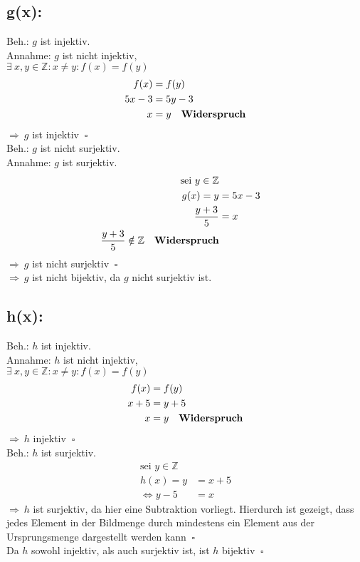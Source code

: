 \documentclass[a4paper]{scrartcl}
\newcommand{\qed}{\ \square}
\begin{document}
\subsection{g(x):}
	Beh.: \(g\) ist injektiv.\\
	Annahme: \(g\) ist nicht injektiv,\\
	\(\exists\ x,y \in \mathbb{Z}:x\neq y:f(x)=f(y)\) 
	\begin{align}
		f(x) &= f(y)\\
		5x-3 &= 5y-3\\
		x&=y \quad \text{\textbf{Widerspruch}}
	\end{align}
	\(\Rightarrow \ g\) ist injektiv \(\qed\)\\

	Beh.: \(g\) ist nicht surjektiv.\\
	Annahme: \(g\) ist surjektiv.\\
	\begin{align}
		\text{sei } y\in\mathbb{Z}\\
		g(x)=y&=5x-3\\
		\frac{y+3}{5}&=x\\
		\frac{y+3}{5}\notin\mathbb{Z}\quad \text{\textbf{Widerspruch}}
	\end{align}
	\(\Rightarrow \ g\) ist nicht surjektiv \(\qed\)\\
	\(\Rightarrow \ g\) ist nicht bijektiv, da \(g\) nicht surjektiv ist.\\

\subsection{h(x):}
	Beh.: \(h\) ist injektiv.\\
	Annahme: \(h\) ist nicht injektiv,\\
	\(\exists\ x,y \in \mathbb{Z}:x\neq y:f(x)=f(y)\)
	\begin{align}
		f(x) &= f(y)\\
		x+5&=y+5\\
		x&=y \quad \text{\textbf{Widerspruch}}
	\end{align}
	\(\Rightarrow \ h\) injektiv \(\qed\)\\
	Beh.: \(h\) ist surjektiv.
	\begin{align}
		\text{sei } y\in\mathbb{Z}\\
		h(x)=y&=x+5\\
		\Leftrightarrow y-5&=x
	\end{align}
	\(\Rightarrow\ h\) ist surjektiv, da hier eine Subtraktion vorliegt. Hierdurch ist gezeigt, dass 
	jedes Element in der Bildmenge durch mindestens ein Element aus der Ursprungsmenge dargestellt 	
	werden kann \(\qed\)\\
	Da \(h\) sowohl injektiv, als auch surjektiv ist, ist \(h\) bijektiv \(\qed\)
\end{document}
